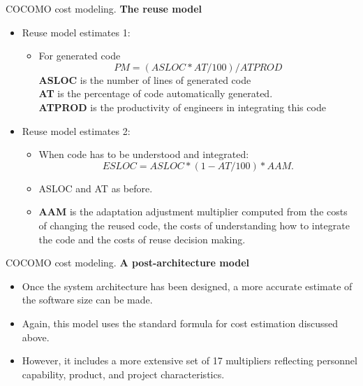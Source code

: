\documentclass{beamer}
\begin{document}
\begin{frame}{COCOMO cost modeling. }
	\textbf{The reuse model}
	\begin{itemize}
		\item  Reuse model estimates 1:
		\begin{itemize}
			\item For generated code $$ PM = (ASLOC * AT/100)/ATPROD $$
		\textbf{ASLOC} is the number of lines of generated code\\
			\textbf{AT} is the percentage of code automatically generated.\\
			\textbf{ATPROD} is the productivity of engineers in integrating this code\\
		\end{itemize}
	\item Reuse model estimates 2:
	\begin{itemize}
		\item When code has to be understood and integrated:$$ESLOC = ASLOC * (1-AT/100) * AAM.$$
		\item ASLOC and AT as before.
		\item \textbf{AAM } is the adaptation adjustment multiplier computed from the costs of
		changing the reused code, the costs of understanding how to integrate the code
		and the costs of reuse decision making.
	\end{itemize}
	\end{itemize}
\end{frame}
\begin{frame}{COCOMO cost modeling. }
	\textbf{A post-architecture model}
	\begin{itemize}
		\item Once the system architecture has been designed, a 
		more accurate estimate of the software size can be made. 
		\item Again, this model uses 
		the standard formula for cost estimation discussed above. 
		\item However, it includes 
		a more extensive set of 17 multipliers reflecting personnel capability, product, 
		and project characteristics.
	\end{itemize}
\end{frame}
\end{document}
